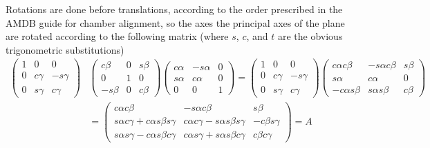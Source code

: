 
Rotations are done before translations, according to the order prescribed in the AMDB guide for chamber alignment, so the axes the principal axes of the plane are rotated according to the following matrix (where $s$, $c$, and $t$ are the obvious trigonometric substitutions)
\begin{equation}
\begin{split}
\left(\begin{array}{ccc} 1&0&0\\ 0& c\gamma& -s\gamma\\ 0&s\gamma&c\gamma\end{array}\right)&
\left(\begin{array}{ccc} c\beta&0& s\beta\\0&1&0 \\ -s\beta&0&c\beta\end{array}\right)
\left(\begin{array}{ccc} c\alpha&-s\alpha&0\\s\alpha&c\alpha&0 \\ 0&0&1\end{array}\right)=
\left(\begin{array}{ccc} 1&0&0\\ 0& c\gamma& -s\gamma\\ 0&s\gamma&c\gamma\end{array}\right)
\left(\begin{array}{ccc} c\alpha c\beta&-s\alpha c\beta&s\beta\\ s\alpha& c\alpha& 0\\ -c\alpha s\beta& s\alpha s\beta& c\beta \end{array}\right)\\
&=\boxed{\left(\begin{array}{ccc} c\alpha c\beta& -s\alpha c\beta& s\beta\\s\alpha c\gamma+c\alpha s\beta s\gamma& c\alpha c\gamma-s\alpha s\beta s\gamma& -c\beta s\gamma\\s\alpha s\gamma-c\alpha s\beta c\gamma& c\alpha s\gamma+s\alpha s\beta c\gamma& c\beta c\gamma\end{array}\right)}=A
\end{split}
\end{equation}

